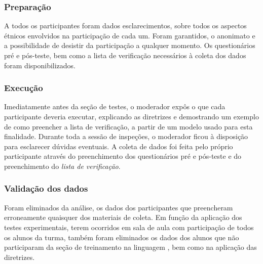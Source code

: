 \subsubsection{Preparação}
\label{operationPrepartation}

A todos  os participantes foram dados esclarecimentos,  sobre todos os
aspectos  étnicos  envolvidos  na  participação  de  cada  um.   Foram
garantidos, o anonimato e  a possibilidade de desistir da participação
a  qualquer momento.   Os questionários  pré e  pós-teste, bem  como a
lista   de  verificação   necessários   à  coleta   dos  dados   foram
disponibilizados.

\subsubsection{Execução}
\label{operationExecution}

Imediatamente antes da  seção de testes, o moderador  expôs o que cada
participante deveria executar,  explicando as diretrizes e demostrando
um exemplo  de como preencher a  lista de verificação, a  partir de um
modelo  usado  para  esta   finalidade.   Durante  toda  a  sessão  de
inspeções,  o moderador  ficou  à disposição  para esclarecer  dúvidas
eventuais.   A coleta  de dados  foi feita  pelo  próprio participante
através  do  preenchimento dos  questionários  pré  e  pós-teste e  do
preenchimento do {\em lista de verificação}.

\subsubsection{Validação dos dados}
\label{operationValidation}

Foram  eliminados   da  análise,   os  dados  dos   participantes  que
preencheram erroneamente quaisquer dos  materiais de coleta. Em função
da aplicação dos testes experimentais, terem ocorridos em sala de aula
com participação de todos os  alunos da turma, também foram eliminados
os dados  dos alunos que não  participaram da seção  de treinamento na
linguagem \aladim, bem como na aplicação das diretrizes.

